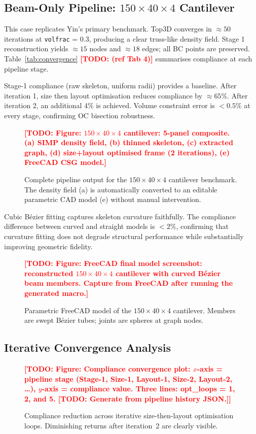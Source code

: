 \documentclass[11pt,a4paper]{article}
\newcommand{\TODO}[1]{\textcolor{red}{\textbf{[TODO: #1]}}}
\newcommand{\figstub}[2]{%
  \begin{figure}[htbp]\centering
    \TODO{Figure: #1}\caption{#2}\end{figure}}
\begin{document}
\subsection{Beam-Only Pipeline: $150\times40\times4$ Cantilever}
\label{subsec:beam_results}

This case replicates Yin's \cite{yin2020} primary benchmark.
Top3D converges in $\approx 50$ iterations at \texttt{volfrac} = 0.3,
producing a clear truss-like density field.
Stage 1 reconstruction yields $\approx 15$ nodes and $\approx 18$ edges;
all BC points are preserved.
Table~\ref{tab:convergence} \TODO{(ref Tab 4)} summarises compliance at each
pipeline stage.

Stage-1 compliance (raw skeleton, uniform radii) provides a baseline.
After iteration 1, size then layout optimisation reduces compliance by
$\approx 65\%$.
After iteration 2, an additional 4\% is achieved.
Volume constraint error is $<0.5\%$ at every stage, confirming OC bisection
robustness.

\figstub{$150\times40\times4$ cantilever: 5-panel composite.
  (a) SIMP density field, (b) thinned skeleton, (c) extracted graph,
  (d) size+layout optimised frame (2 iterations), (e) FreeCAD CSG model.}{
  Complete pipeline output for the $150\times40\times4$ cantilever benchmark.
  The density field (a) is automatically converted to an editable parametric
  CAD model (e) without manual intervention.}

Cubic Bézier fitting captures skeleton curvature faithfully.
The compliance difference between curved and straight models is $<2\%$,
confirming that curvature fitting does not degrade structural performance while
substantially improving geometric fidelity.

\figstub{FreeCAD final model screenshot: reconstructed $150\times40\times4$
  cantilever with curved Bézier beam members. Capture from FreeCAD
  after running the generated macro.}{
  Parametric FreeCAD model of the $150\times40\times4$ cantilever.
  Members are swept Bézier tubes; joints are spheres at graph nodes.}

\subsection{Iterative Convergence Analysis}
\label{subsec:convergence_results}

\figstub{Compliance convergence plot: $x$-axis = pipeline stage
  (Stage-1, Size-1, Layout-1, Size-2, Layout-2, \ldots),
  $y$-axis = compliance value. Three lines: opt\_loops = 1, 2, and 5.
  \TODO{Generate from pipeline history JSON.}}{
  Compliance reduction across iterative size-then-layout optimisation loops.
  Diminishing returns after iteration~2 are clearly visible.}
\end{document}
